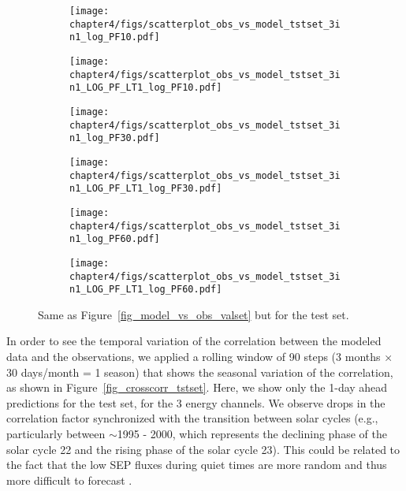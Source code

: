 \begin{figure}[htp]
    \centering
    \begin{subfigure}
         \centering
         \texttt{[image: chapter4/figs/scatterplot\_obs\_vs\_model\_tstset\_3in1\_log\_PF10.pdf]}
    \end{subfigure}
    \begin{subfigure}
         \centering
         \texttt{[image: chapter4/figs/scatterplot\_obs\_vs\_model\_tstset\_3in1\_LOG\_PF\_LT1\_log\_PF10.pdf]}
    \end{subfigure}
    \begin{subfigure}
         \centering
         \texttt{[image: chapter4/figs/scatterplot\_obs\_vs\_model\_tstset\_3in1\_log\_PF30.pdf]}
    \end{subfigure}
    \begin{subfigure}
         \centering
         \texttt{[image: chapter4/figs/scatterplot\_obs\_vs\_model\_tstset\_3in1\_LOG\_PF\_LT1\_log\_PF30.pdf]}
    \end{subfigure}
    \begin{subfigure}
         \centering
         \texttt{[image: chapter4/figs/scatterplot\_obs\_vs\_model\_tstset\_3in1\_log\_PF60.pdf]}
    \end{subfigure}
    \begin{subfigure}
         \centering
         \texttt{[image: chapter4/figs/scatterplot\_obs\_vs\_model\_tstset\_3in1\_LOG\_PF\_LT1\_log\_PF60.pdf]}
    \end{subfigure}
\caption{Same as Figure~\ref{fig_model_vs_obs_valset} but for the test set.}
\label{fig_model_vs_obs_tstset}
\end{figure}

In order to see the temporal variation of the correlation between the modeled data and the observations, we applied a rolling window of 90 steps (3 months × 30 days/month = 1 season) that shows the seasonal variation of the correlation, as shown in Figure~\ref{fig_crosscorr_tstset}.  
Here, we show only the 1-day ahead predictions for the test set, for the 3 energy channels. 
We observe drops in the correlation factor synchronized with the transition between solar cycles (e.g., particularly between $\sim$1995 - 2000, which represents the declining phase of the solar cycle 22 and the rising phase of the solar cycle 23). This could be related to the fact that the low SEP fluxes during quiet times are more random and thus more difficult to forecast \citep{feynman_1990, gabriel_1990, rodriguez_2010, xapsos_2012}.

